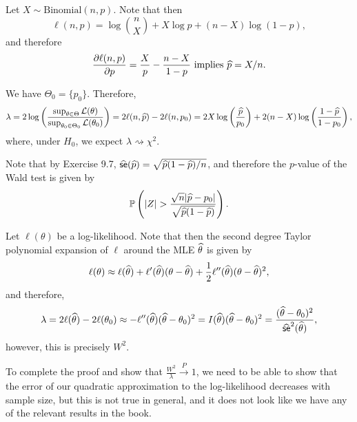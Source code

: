 \begin{ex}
  Let $X \sim \text{Binomial}(n, p)$. Note that then
  \[
    \ell(n, p)=\log\binom{n}{X}+X\log{p}+(n-X)\log(1-p),
  \]
  and therefore
  \[
    \frac{\partial\ell(n, p)}{\partial{p}}
    =\frac{X}{p}-\frac{n-X}{1-p}
    \text{ implies }
    \widehat{p} =X/n.
  \]

  We have $\Theta_0=\{p_0\}$. Therefore,
  \[
    \lambda
    =2\log\left(\frac{\sup_{\theta\in\Theta}\mathcal{L}(\theta)}{\sup_{\theta_0\in\Theta_0}\mathcal{L}(\theta_0)} \right)
    =2\ell(n, \widehat{p})-2\ell(n, p_0)
    =2X\log\left(\frac{\widehat{p}}{p_0}\right)+2(n-X)\log\left(\frac{1-\widehat{p}}{1-p_0}\right),
  \]
  where, under $H_0$, we expect $\lambda\rightsquigarrow \chi^2$.

  Note that by Exercise 9.7, $\widehat{\textsf{se}}(\widehat{p})=\sqrt{\widehat{p}(1-\widehat{p})/n}$, and
  therefore the $p$-value of the Wald test is given by
  \[
    \P{|Z|>\frac{\sqrt{n}|\phat-p_0|}{\sqrt{\phat(1-\phat)}}}.
  \]
\end{ex}

\begin{ex}
  Let $\ell(\theta)$ be a log-likelihood. Note that then the second degree
  Taylor polynomial expansion of $\ell$ around the MLE $\widehat{\theta}$ is given by
  \[
    \ell(\theta)
    \approx
    \ell(\widehat{\theta})+\ell'(\widehat{\theta})(\theta-\widehat{\theta})
    +\frac{1}{2}\ell''(\widehat{\theta})(\theta-\widehat{\theta})^2,
  \]
  and therefore,
  \[
    \lambda
    =2\ell(\widehat{\theta})-2\ell(\theta_0)
    \approx -\ell''(\widehat{\theta})(\widehat{\theta}-\theta_0)^2
    = I(\widehat{\theta})(\widehat{\theta}-\theta_0)^2
    = \frac{(\widehat{\theta}-\theta_0)^2}{\widehat{\textsf{se}}^2(\widehat{\theta})},
  \]
  however, this is precisely $W^2$.

  To complete the proof and show that $\frac{W^2}{\lambda}\xrightarrow{P} 1$, we
  need to be able to show that the error of our quadratic approximation to the
  log-likelihood decreases with sample size, but this is not true in general,
  and it does not look like we have any of the relevant results in the book.
\end{ex}